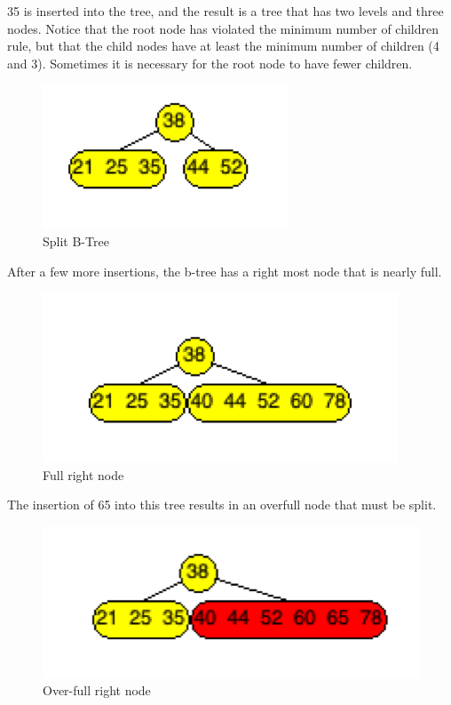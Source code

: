 35 is inserted into the tree, and the result is a tree that has two levels and three nodes. Notice that the root node has violated the minimum number of children rule, but that the child nodes have at least the minimum number of children (4 and 3). Sometimes it is necessary for the root node to have fewer children.

\begin{figure}[H]
\centering
\includegraphics{pictures/tree25.png}
\caption{Split B-Tree}
\label{fig:tree25}
\end{figure}

After a few more insertions, the b-tree has a right most node that is nearly full.

\begin{figure}[H]
\centering
\includegraphics{pictures/tree26.png}
\caption{Full right node}
\label{fig:tree26}
\end{figure}

The insertion of 65 into this tree results in an overfull node that must be split.

\begin{figure}[H]
\centering
\includegraphics{pictures/tree27.png}
\caption{Over-full right node}
\label{fig:tree27}
\end{figure}

